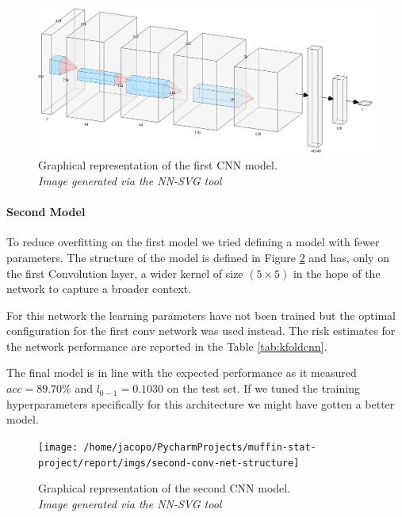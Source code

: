\begin{figure}[h]
    \centering
    \includegraphics[scale=0.15]{imgs/custom-cnn-one}
    \caption{
        Graphical representation of the first CNN model.\\
        \textit{Image generated via the NN-SVG tool}
    }\label{fig:custom_cnn}
\end{figure}

\paragraph{Second Model}

To reduce overfitting on the first model we tried defining a model with fewer parameters.
The structure of the model is defined in Figure \ref{fig:second-conv-net-structure}
and has, only on the first Convolution layer, a wider kernel of size $(5\times5)$ in the hope of the network to capture a broader context.

For this network the learning parameters have not been trained but the optimal configuration for the first conv network
was used instead.
The risk estimates for the network performance are reported in the Table \ref{tab:kfoldcnn}.

The final model is in line with the expected performance as it measured $acc=89.70\%$ and $l_{0-1}=0.1030$ on the test set.
If we tuned the training hyperparameters specifically for this architecture we might have gotten a better model.


\begin{figure}
    \centering
    \texttt{[image: /home/jacopo/PycharmProjects/muffin-stat-project/report/imgs/second-conv-net-structure]}
    \caption{
        Graphical representation of the second CNN model.\\
        \textit{Image generated via the NN-SVG tool}
    }
    \label{fig:second-conv-net-structure}
\end{figure}


